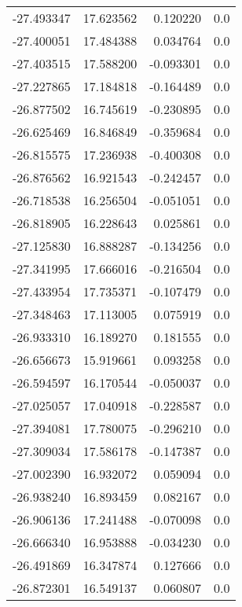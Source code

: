 \begin{tabular}{rrrr}
      -27.493347 &        17.623562 &    0.120220 &   0.0 \\
      -27.400051 &        17.484388 &    0.034764 &   0.0 \\
      -27.403515 &        17.588200 &   -0.093301 &   0.0 \\
      -27.227865 &        17.184818 &   -0.164489 &   0.0 \\
      -26.877502 &        16.745619 &   -0.230895 &   0.0 \\
      -26.625469 &        16.846849 &   -0.359684 &   0.0 \\
      -26.815575 &        17.236938 &   -0.400308 &   0.0 \\
      -26.876562 &        16.921543 &   -0.242457 &   0.0 \\
      -26.718538 &        16.256504 &   -0.051051 &   0.0 \\
      -26.818905 &        16.228643 &    0.025861 &   0.0 \\
      -27.125830 &        16.888287 &   -0.134256 &   0.0 \\
      -27.341995 &        17.666016 &   -0.216504 &   0.0 \\
      -27.433954 &        17.735371 &   -0.107479 &   0.0 \\
      -27.348463 &        17.113005 &    0.075919 &   0.0 \\
      -26.933310 &        16.189270 &    0.181555 &   0.0 \\
      -26.656673 &        15.919661 &    0.093258 &   0.0 \\
      -26.594597 &        16.170544 &   -0.050037 &   0.0 \\
      -27.025057 &        17.040918 &   -0.228587 &   0.0 \\
      -27.394081 &        17.780075 &   -0.296210 &   0.0 \\
      -27.309034 &        17.586178 &   -0.147387 &   0.0 \\
      -27.002390 &        16.932072 &    0.059094 &   0.0 \\
      -26.938240 &        16.893459 &    0.082167 &   0.0 \\
      -26.906136 &        17.241488 &   -0.070098 &   0.0 \\
      -26.666340 &        16.953888 &   -0.034230 &   0.0 \\
      -26.491869 &        16.347874 &    0.127666 &   0.0 \\
      -26.872301 &        16.549137 &    0.060807 &   0.0 \\

\end{tabular}
